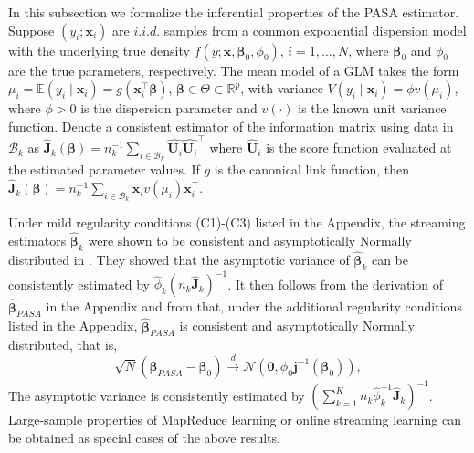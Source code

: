 \documentclass[12pt]{article}
\newcommand{\bJ}{\boldsymbol{J}}
\newcommand{\bU}{\boldsymbol{U}}
\newcommand{\bx}{\boldsymbol{x}}
\newcommand{\bbeta}{\boldsymbol{\beta}}
\begin{document}
In this subsection we formalize the inferential properties of the PASA estimator. Suppose $(y_i;\bx_i)$ are $i.i.d.$ samples from a common exponential dispersion model with the underlying true density $f(y;\bx,\bbeta_0,\phi_0)$, $i=1,\dots,N$, where $\bbeta_0$ and $\phi_0$ are the true parameters, respectively.  The mean model of a GLM takes the form $\mu_i=\mathbb{E}(y_i\mid\bx_i)=g(\bx_i^\top\bbeta)$, $\bbeta\in\Theta\subset\mathbb{R}^p$, with variance $V(y_i\mid\bx_i)=\phi v(\mu_i)$, where $\phi>0$ is the dispersion parameter and $v(\cdot)$ is the known unit variance function.  Denote a  consistent estimator of the information matrix using data in $\mathcal{B}_k$ as  $\widehat{\bm{J}}_{k}(\bbeta)=n_k^{-1}\sum_{i\in\mathcal{B}_{k}}\widehat{\bU_i}\widehat{\bU_i}^\top$ where $\widehat{\bU}_i$ is the score function evaluated at the estimated parameter values. If $g$ is the canonical link function, then $\bm{\widehat{J}}_k(\bbeta)=n_k^{-1}\sum_{i\in\mathcal{B}_{k}}\bx_iv(\mu_i)\bx_i^\top$.

Under mild regularity conditions (C1)-(C3) listed in the Appendix, the streaming estimators $\widehat{\bbeta}_k$ were shown to be consistent and asymptotically Normally distributed in \cite{Luo-Song-2020}. They showed that the asymptotic variance of $\widehat{\bbeta}_k$ can be consistently estimated by $\widehat{\phi}_k (n_k\widehat{\bJ}_k)^{-1}$. It then follows from the derivation of $\widehat{\bbeta}_{PASA}$ in the Appendix and from \cite{Hector-Song-JMLR} that, under the additional regularity conditions listed in the Appendix, $\widehat{\bbeta}_{PASA}$ is consistent and asymptotically Normally distributed, that is,
\[
\sqrt{N}(\widehat{\bbeta}_{PASA} - \bbeta_0) \overset{d}{\to}\mathcal{N}\left(\bm{0},\phi_0 \bm{j}^{-1}(\bbeta_{0})\right),
\]
The asymptotic variance is consistently estimated by $(\sum_{k=1}^K n_k \widehat{\phi}_k^{-1} \widehat{\bJ}_k )^{-1}$.  Large-sample properties of MapReduce learning or online streaming learning can be obtained as special cases of the above results. 
\end{document}
